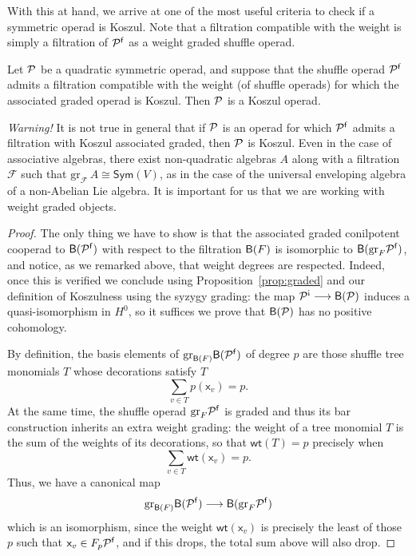  
 With this at hand, we arrive at one of the most
 useful criteria to check if a symmetric operad
 is Koszul. Note that a filtration compatible with
 the weight is simply a filtration of ${\mathcal{P}}^{\mathsf{f}}$
 as a weight graded shuffle operad. 
 
 \begin{theorem}
 Let ${\mathcal{P}}$ be a quadratic
 symmetric operad, and suppose
 that the shuffle operad ${\mathcal{P}}^{\mathsf{f}}$ admits
 a filtration compatible with the weight
 (of shuffle operads) for which
 the associated graded operad is Koszul.
 Then ${\mathcal{P}}$ is a Koszul operad.
 \end{theorem}
 
 \emph{Warning!} It is not true in general
 that if ${\mathcal{P}}$ is an operad for which ${\mathcal{P}}^{\mathsf{f}}$
 admits a filtration with Koszul associated
 graded, then ${\mathcal{P}}$ is Koszul. Even in the case
 of associative algebras, there exist non-quadratic
 algebras $A$ along with a filtration $\mathcal F$
 such that $\mathrm{gr}_\mathcal F \, A \cong 
 \mathsf{Sym}(V)$, as in the case of the
 universal enveloping algebra of a non-Abelian
 Lie algebra. It is important for us that we
 are working with weight graded objects.
 
 \begin{proof}
 The only thing we have to show is that the
 associated graded conilpotent cooperad to
 $\mathsf{B}({\mathcal{P}}^{\mathsf{f}})$ with respect to the filtration
 $\mathsf{B}(F)$ is isomorphic to $\mathsf{B}(\mathrm{gr}_F{\mathcal{P}}^{\mathsf{f}})$,
 and notice, as we remarked above, that
 weight degrees are respected.
 Indeed, once this is verified we conclude using
 Proposition~\ref{prop:graded} and our definition
 of Koszulness using the syzygy grading: the
 map $\PP^\antishriek \longrightarrow \B{\PP}$
 induces a quasi-isomorphism in $H^0$, so it suffices
 we prove that $\mathsf{B}({\mathcal{P}})$ has no positive cohomology.
 
 By definition, the basis elements of
 $\mathrm{gr}_{\mathsf{B}(F)}\mathsf{B}({\mathcal{P}}^{\mathsf{f}})$ of degree $p$
 are those shuffle tree monomials $T$
 whose decorations satisfy $T$
 \[
 \sum_{v\in T} p(\mathsf{x}_v) = p.
 \]
 At the same time, the shuffle operad 
 $\mathrm{gr}_F{\mathcal{P}}^{\mathsf{f}}$  is graded and 
 thus its bar construction inherits an
 extra weight grading: the weight of a tree
 monomial $T$ is the sum of the weights of its
 decorations, so that $\mathsf{wt}(T)= p$
 precisely when
 \[
 \sum_{v\in T} \mathsf{wt}(\mathsf{x}_v) = p.
 \]
 Thus, we have a canonical map
 \[
 \mathrm{gr}_{\mathsf{B}(F)}\mathsf{B}({\mathcal{P}}^{\mathsf{f}}) \longrightarrow
 \mathsf{B}(\mathrm{gr}_F{\mathcal{P}}^{\mathsf{f}})
 \]
 which is an isomorphism, since the weight
 $\mathsf{wt}(\mathsf{x}_v)$ is precisely
 the least of those $p$ such that $\mathsf{x}_v
 \in F_p{\mathcal{P}}^{\mathsf{f}}$, and if this drops, the total sum above
 will also drop.  \end{proof}
 
